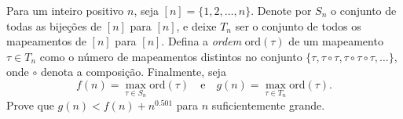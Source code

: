 Para um inteiro positivo \(n\), seja \([n] = \{1, 2, \ldots, n\}\). Denote por \(S_n\) o conjunto de todas as bijeções de \([n]\) para \([n]\), e deixe \(T_n\) ser o conjunto de todos os mapeamentos de \([n]\) para \([n]\). Defina a \textit{ordem} \(\mathrm{ord}(\tau)\) de um mapeamento \(\tau \in T_n\) como o número de mapeamentos distintos no conjunto \(\{\tau, \tau \circ \tau, \tau \circ \tau \circ \tau, \ldots\}\), onde \(\circ\) denota a composição. Finalmente, seja
\[
f(n) = \max_{\tau \in S_n} \mathrm{ord}(\tau) \quad \text{e} \quad g(n) = \max_{\tau \in T_n} \mathrm{ord}(\tau).
\]
Prove que \(g(n) < f(n) + n^{0.501}\) para \(n\) suficientemente grande.
